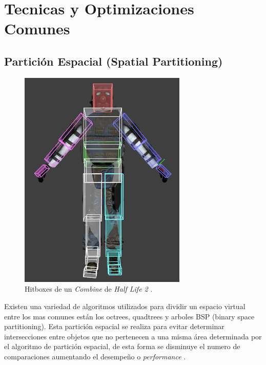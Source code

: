 \section{Tecnicas y Optimizaciones Comunes}
\subsection{Partición Espacial (Spatial Partitioning)}
\setlength\intextsep{0pt}
\begin{figure}
\includegraphics[width=\linewidth]{media/Hitbox.jpg}
\caption{Hitboxes de un \emph{Combine} de \emph{Half Life 2} \cite{valve_hit} \cite{halflife2}.}
\label{fig:hitboxes}
\end{figure}
Existen una variedad de algoritmos utilizados para dividir un espacio virtual entre los mas comunes están los octrees, quadtrees y arboles BSP (binary space partitioning). Esta partición espacial se realiza para evitar determinar intersecciones entre objetos que no pertenecen a una misma área determinada por el algoritmo de partición espacial, de esta forma se disminuye el numero de comparaciones aumentando el desempeño o \emph{performance} \cite{sp_partition}.
